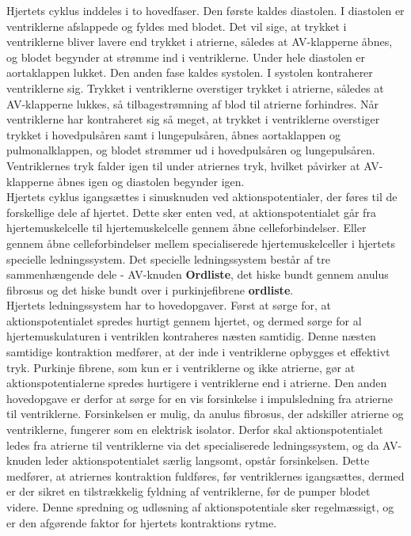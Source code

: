 Hjertets cyklus inddeles i to hovedfaser. Den første kaldes diastolen. I diastolen er ventriklerne afslappede og fyldes med blodet. Det vil sige, at trykket i ventriklerne bliver lavere end trykket i atrierne, således at AV-klapperne åbnes, og blodet begynder at strømme ind i ventriklerne. Under hele diastolen er aortaklappen lukket. Den anden fase kaldes systolen. I systolen kontraherer ventriklerne sig. Trykket i ventriklerne overstiger trykket i atrierne, således at AV-klapperne lukkes, så tilbagestrømning af blod til atrierne forhindres. Når ventriklerne har kontraheret sig så meget, at trykket i ventriklerne overstiger trykket i hovedpulsåren samt i lungepulsåren, åbnes aortaklappen og pulmonalklappen, og blodet strømmer ud i hovedpulsåren og lungepulsåren. Ventriklernes tryk falder igen til under atriernes tryk, hvilket påvirker at AV-klapperne åbnes igen og diastolen begynder igen.\\
Hjertets cyklus igangsættes i sinusknuden ved aktionspotentialer, der føres til de forskellige dele af hjertet. Dette sker enten ved, at aktionspotentialet går fra hjertemuskelcelle til hjertemuskelcelle gennem åbne celleforbindelser. Eller gennem åbne celleforbindelser mellem specialiserede hjertemuskelceller i hjertets specielle ledningssystem. Det specielle ledningssystem består af tre sammenhængende dele - AV-knuden \textbf{ Ordliste}, det hiske bundt gennem anulus fibrosus og det hiske bundt over i purkinjefibrene \textbf{ ordliste}. \\
Hjertets ledningssystem har to hovedopgaver. Først at sørge for, at aktionspotentialet spredes hurtigt gennem hjertet, og dermed sørge for al hjertemuskulaturen i ventriklen kontraheres næsten samtidig. Denne næsten samtidige kontraktion medfører, at der inde i ventriklerne opbygges et effektivt tryk. Purkinje fibrene, som kun er i ventriklerne og ikke atrierne, gør at aktionspotentialerne spredes hurtigere i ventriklerne end i atrierne. Den anden hovedopgave er derfor at sørge for en vis forsinkelse i impulsledning fra atrierne til ventriklerne. Forsinkelsen er mulig, da anulus fibrosus, der adskiller atrierne og ventriklerne, fungerer som en elektrisk isolator. Derfor skal aktionspotentialet ledes fra atrierne til ventriklerne via det specialiserede ledningssystem, og da AV-knuden leder aktionspotentialet særlig langsomt, opstår forsinkelsen. Dette medfører, at atriernes kontraktion fuldføres, før ventriklernes igangsættes, dermed er der sikret en tilstrækkelig fyldning af ventriklerne, før de pumper blodet videre. Denne spredning og udløsning af aktionspotentiale sker regelmæssigt, og er den afgørende faktor for hjertets kontraktions rytme.
